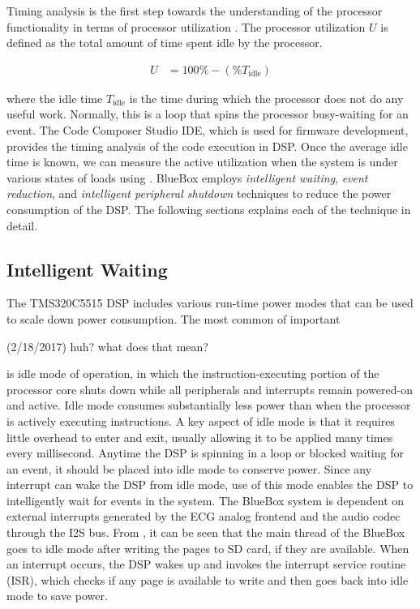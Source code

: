 Timing analysis is the first step towards the understanding of the
processor functionality in terms of processor utilization
\cite{sastra}. The processor utilization $U$ is defined as the total
amount of time spent idle by the processor. 

\begin{align}
	U &= 100\% - (\% T_\text{idle})
\label{eq:idleUtil}
\end{align}

where the idle time $T_\text{idle}$ is the time during which the
processor does not do any useful work. Normally, this is a loop that
spins the processor busy-waiting for an event. The Code Composer
Studio IDE, which is used for firmware development, provides the
timing analysis of the code execution in DSP. Once the average idle
time is known, we can measure the active utilization when the system
is under various states of loads using . BlueBox
employs \emph{intelligent waiting}, \emph{event reduction}, and
\emph{intelligent peripheral shutdown} techniques to reduce the power
consumption of the DSP. The following sections explains each of the
technique in detail. 

\subsection{Intelligent Waiting}

The TMS320C5515 DSP includes various run-time power modes that can be
used to scale down power consumption. The most common of important
\begin{cmtPai}
	(2/18/2017) huh? what does that mean?
\end{cmtPai}
is idle mode of operation, in which the instruction-executing portion
of the processor core shuts down while all peripherals and interrupts
remain powered-on and active. Idle mode consumes substantially less
power than when the processor is actively executing instructions. A
key aspect of idle mode is that it requires little overhead to enter
and exit, usually allowing it to be applied many times every
millisecond.  Anytime the DSP is spinning in a loop or blocked
waiting for an event, it should be placed into idle mode to conserve
power. Since any interrupt can wake the DSP from idle mode, use of
this mode enables the DSP to intelligently wait for events in the
system. The BlueBox system is dependent on external interrupts
generated by the ECG analog frontend and the audio codec through the
I2S bus. From , it can be seen that the main thread of the
BlueBox goes to idle mode after writing the pages to SD card, if they
are available.  When an interrupt occurs, the DSP wakes up and
invokes the interrupt service routine (ISR), which checks if any page
is available to write and then goes back into idle mode to save
power. 


